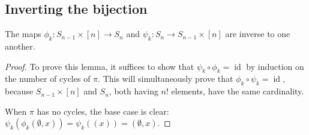 \subsection{Inverting the bijection}
\begin{lemma}
  \label{lem:bijection}
  The maps
  $\phi_k \colon S_{n-1} \times [n] \rightarrow S_n$ and
  $\psi_k \colon S_n \rightarrow S_{n-1} \times [n]$ are inverse to one another.
\end{lemma}
\begin{proof}
  To prove this lemma, it suffices to show that $\psi_k \circ \phi_k = \operatorname{id}$
  by induction on the number of cycles of $\pi$. This will simultaneously prove
  that $\phi_k \circ \psi_k = \operatorname{id}$, because $S_{n-1} \times [n]$
  and $S_n$, both having $n!$ elements, have the same cardinality.

  When $\pi$ has no cycles, the base case is clear:
  $\psi_k(\phi_k(\emptyset, x)) = \psi_k((x)) = (\emptyset, x)$.


\end{proof}
